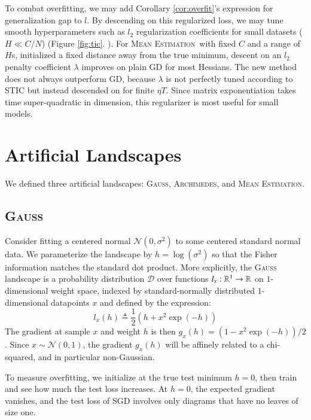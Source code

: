 \documentclass[openany, notitlepage, justified]{tufte-book}
\newcommand{\oftwo}[1]{%
    {\tiny\raisebox{0.04cm}{$%
        \ifthenelse{\equal{#1}{0}}{{\color{moor}\blacksquare}}{\square}%
        \ifthenelse{\equal{#1}{1}}{{\color{moor}\blacksquare}}{\square}%
    $}}%
}
\theoremstyle{plain}
\theoremstyle{definition}
\newcommand{\wrap}[1]{\left(#1\right)}
\newcommand{\Dd}{\mathcal{D}}
\newcommand{\Nn}{\mathcal{N}}   \newcommand{\NN}{\mathbb{N}}
\newcommand{\Gauss}{\textsc{Gauss}}
\newcommand{\Archimedes}{\textsc{Archimedes}}
\newcommand{\MeanEstimation}{\textsc{Mean Estimation}}
\begin{document}
        To combat overfitting, we may add Corollary \ref{cor:overfit}'s
        expression for generalization gap to $l$.  By descending on this
        regularized loss, we may tune smooth hyperparameters such as $l_2$
        regularization coefficients for small datasets ($H \ll C/N$)
        (Figure \ref{fig:tic}.\oftwo{1}).  
        For \MeanEstimation\ with fixed $C$ and a range of $H$s, initialized a
        fixed distance away from the true minimum, descent on an $l_2$
        penalty coefficient $\lambda$ improves on plain GD for most Hessians.
        The new method does not always outperform GD, because $\lambda$ is not
        perfectly tuned according to STIC but instead descended on for finite
        $\eta T$.
        Since matrix exponentiation takes time super-quadratic in dimension,
        this regularizer is most useful for small models.

        \newpage
    \section{Artificial Landscapes}\label{appendix:artificial-landscapes}

        We defined three artificial landscapes:
        \Gauss, \Archimedes, and \MeanEstimation.

        \subsection{\Gauss}
            Consider fitting a centered normal $\Nn(0, \sigma^2)$ to some
            centered standard normal data.  We parameterize the landscape by
            $h=\log(\sigma^2)$ so that the Fisher information matches the
            standard dot product.\cite{am98}
            More explicitly, the \Gauss\, landscape is a probability
            distribution $\Dd$ over functions $l_x:\mathbb{R}^1\to \mathbb{R}$ on
            $1$-dimensional weight space, indexed by standard-normally
            distributed $1$-dimensional datapoints $x$ and defined by the
            expression:
            $$
                l_x(h)
                \triangleq
                \frac{1}{2} \wrap{h + x^2 \exp(-h)}
            $$
            The gradient at sample $x$ and weight $h$ is then $g_x(h) =
            (1-x^2\exp(-h))/2$.  Since $x\sim \Nn(0, 1)$, the gradient $g_x(h)$
            will be affinely related to a chi-squared, and in particular
            non-Gaussian.
            
            To measure overfitting, we initialize at the true test minimum
            $h=0$, then train and see how much the test loss increases.  At
            $h=0$, the expected gradient vanishes, and the test loss of SGD
            involves only diagrams that have no leaves of size one.
            
\end{document}
